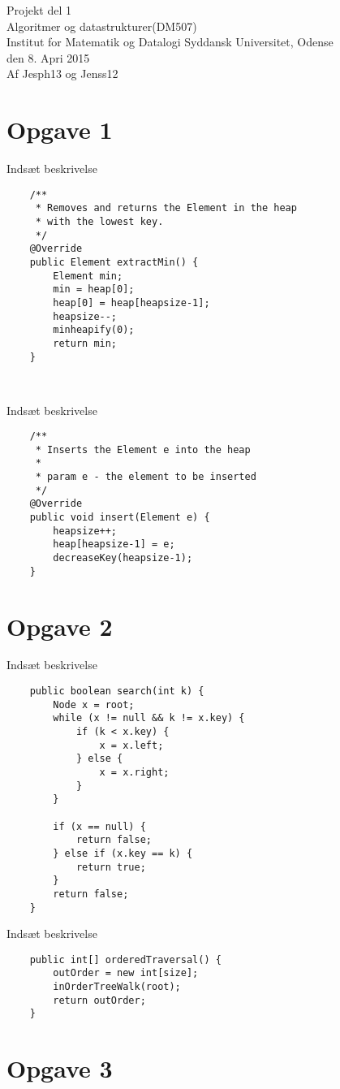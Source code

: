 \documentclass{article}
\begin{document}
{\centering 
\huge
Projekt del 1\\
Algoritmer og datastrukturer(DM507)\\
\large
\bigskip
Institut for Matematik og Datalogi Syddansk Universitet, Odense\\
\bigskip
den 8. Apri 2015\\
\bigskip
Af Jesph13 og Jenss12\\
}
\newpage
\section*{Opgave 1}
Indsæt beskrivelse
\begin{lstlisting}
	/**
     * Removes and returns the Element in the heap
     * with the lowest key.
     */
    @Override
    public Element extractMin() {
        Element min;
        min = heap[0];
        heap[0] = heap[heapsize-1];
        heapsize--;
        minheapify(0);
        return min;
    }
    
    
\end{lstlisting}
Indsæt beskrivelse
\begin{lstlisting}
	/**
     * Inserts the Element e into the heap
     *
     * param e - the element to be inserted
     */
    @Override
    public void insert(Element e) {
        heapsize++;
        heap[heapsize-1] = e;
        decreaseKey(heapsize-1);
    }
\end{lstlisting}
\newpage
\section*{Opgave 2}
Indsæt beskrivelse
\begin{lstlisting}
	public boolean search(int k) {
        Node x = root;
        while (x != null && k != x.key) {
            if (k < x.key) {
                x = x.left;
            } else {
                x = x.right;
            }
        }

        if (x == null) {
            return false;
        } else if (x.key == k) {
            return true;
        }
        return false;
    }
\end{lstlisting}
Indsæt beskrivelse
\begin{lstlisting}
	public int[] orderedTraversal() {
        outOrder = new int[size];
        inOrderTreeWalk(root);
        return outOrder;
    }
\end{lstlisting}
\newpage
\section*{Opgave 3}
\end{document}
